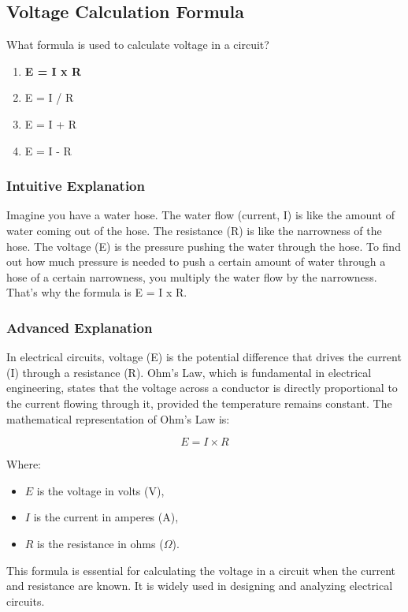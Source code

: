\subsection{Voltage Calculation Formula}
\label{T5D02}

\begin{tcolorbox}[colback=gray!10!white,colframe=black!75!black,title=T5D02]
What formula is used to calculate voltage in a circuit?
\begin{enumerate}[noitemsep]
    \item \textbf{E = I x R}
    \item E = I / R
    \item E = I + R
    \item E = I - R
\end{enumerate}
\end{tcolorbox}

\subsubsection{Intuitive Explanation}
Imagine you have a water hose. The water flow (current, I) is like the amount of water coming out of the hose. The resistance (R) is like the narrowness of the hose. The voltage (E) is the pressure pushing the water through the hose. To find out how much pressure is needed to push a certain amount of water through a hose of a certain narrowness, you multiply the water flow by the narrowness. That's why the formula is E = I x R.

\subsubsection{Advanced Explanation}
In electrical circuits, voltage (E) is the potential difference that drives the current (I) through a resistance (R). Ohm's Law, which is fundamental in electrical engineering, states that the voltage across a conductor is directly proportional to the current flowing through it, provided the temperature remains constant. The mathematical representation of Ohm's Law is:

\[
E = I \times R
\]

Where:
\begin{itemize}
    \item \( E \) is the voltage in volts (V),
    \item \( I \) is the current in amperes (A),
    \item \( R \) is the resistance in ohms ($\Omega$).
\end{itemize}

This formula is essential for calculating the voltage in a circuit when the current and resistance are known. It is widely used in designing and analyzing electrical circuits.